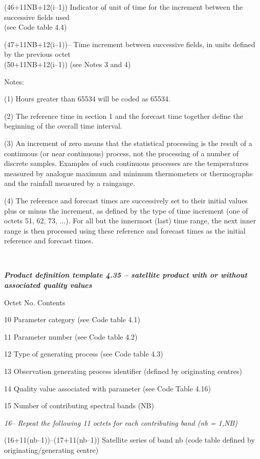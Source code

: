 (46+11NB+12(i--1)) Indicator of unit of time for the increment between the successive fields used\\
(see Code table 4.4)

(47+11NB+12(i--1))-- Time increment between successive fields, in units defined by the previous octet\\
(50+11NB+12(i--1)) (see Notes 3 and 4)

Notes:

(1) Hours greater than 65534 will be coded as 65534.

(2) The reference time in section 1 and the forecast time together define the beginning of the overall time interval.

(3) An increment of zero means that the statistical processing is the result of a continuous (or near continuous) process, not the processing of a number of discrete samples. Examples of such continuous processes are the temperatures measured by analogue maximum and minimum thermometers or thermographs and the rainfall measured by a raingauge.

(4) The reference and forecast times are successively set to their initial values plus or minus the increment, as defined by the type of time increment (one of octets 51, 62, 73, ...). For all but the innermost (last) time range, the next inner range is then processed using these reference and forecast times as the initial reference and forecast times.

\emph{\textbf{\\
}}

\emph{\textbf{Product definition template 4.35 -- satellite product with or without associated quality values}}

Octet No. Contents

10 Parameter category (see Code table 4.1)

11 Parameter number (see Code table 4.2)

12 Type of generating process (see Code table 4.3)

13 Observation generating process identifier (defined by originating centres)

14 Quality value associated with parameter (see Code Table 4.16)

15 Number of contributing spectral bands (NB)

\emph{16-- Repeat the following 11 octets for each contributing band (nb = 1,NB)}

(16+11(nb--1))--(17+11(nb--1)) Satellite series of band nb (code table defined by originating/generating centre)


